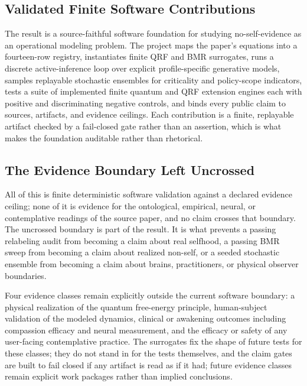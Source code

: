 \documentclass[
]{article}
\newcounter{none} %
\begin{document}
\subsection{Validated Finite Software
Contributions}\label{sec:conclusion-validated-contributions}

The result is a source-faithful software foundation for studying
no-self-evidence as an operational modeling problem. The project maps
the paper's equations into a fourteen-row registry, instantiates finite
QRF and BMR surrogates, runs a discrete active-inference loop over
explicit profile-specific generative models, samples replayable
stochastic ensembles for criticality and policy-scope indicators, tests
a suite of implemented finite quantum and QRF extension engines each
with positive and discriminating negative controls, and binds every
public claim to sources, artifacts, and evidence ceilings. Each
contribution is a finite, replayable artifact checked by a fail-closed
gate rather than an assertion, which is what makes the foundation
auditable rather than rhetorical.

\subsection{The Evidence Boundary Left
Uncrossed}\label{sec:conclusion-evidence-boundary}

All of this is finite deterministic software validation against a
declared evidence ceiling; none of it is evidence for the ontological,
empirical, neural, or contemplative readings of the source paper, and no
claim crosses that boundary. The uncrossed boundary is part of the
result. It is what prevents a passing relabeling audit from becoming a
claim about real selfhood, a passing BMR sweep from becoming a claim
about realized non-self, or a seeded stochastic ensemble from becoming a
claim about brains, practitioners, or physical observer boundaries.

Four evidence classes remain explicitly outside the current software
boundary: a physical realization of the quantum free-energy principle,
human-subject validation of the modeled dynamics, clinical or awakening
outcomes including compassion efficacy and neural measurement, and the
efficacy or safety of any user-facing contemplative practice. The
surrogates fix the shape of future tests for these classes; they do not
stand in for the tests themselves, and the claim gates are built to fail
closed if any artifact is read as if it had; future evidence classes
remain explicit work packages rather than implied conclusions.
\end{document}
